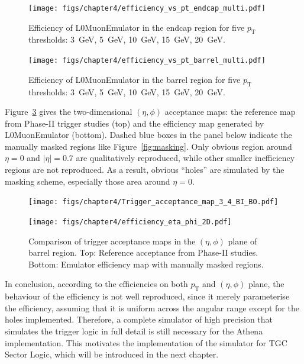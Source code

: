 \begin{figure}[htbp]
  \centering
  \texttt{[image: figs/chapter4/efficiency\_vs\_pt\_endcap\_multi.pdf]}
  \caption{Efficiency of L0MuonEmulator in the endcap region for five $p_\mathrm{T}$ thresholds: 3~GeV, 5~GeV, 10~GeV, 15~GeV, 20~GeV.}
  \label{fig:eff_pt_endcap}
\end{figure}

\begin{figure}[htbp]
  \centering
  \texttt{[image: figs/chapter4/efficiency\_vs\_pt\_barrel\_multi.pdf]}
  \caption{Efficiency of L0MuonEmulator in the barrel region for five $p_\mathrm{T}$ thresholds: 3~GeV, 5~GeV, 10~GeV, 15~GeV, 20~GeV.}
  \label{fig:eff_pt_barrel}
\end{figure}

Figure~\ref{fig:eta_phi_comparison} gives the two-dimensional $(\eta, \phi)$ acceptance maps: the reference map from Phase-II trigger studies (top) and the efficiency map generated by L0MuonEmulator (bottom). Dashed blue boxes in the panel below indicate the manually masked regions like Figure~\ref{fig:masking}. Only obvious region around $\eta = 0$ and $|\eta| = 0.7$ are qualitatively reproduced, while other smaller inefficiency regions are not reproduced. As a result, obvious ``holes'' are simulated by the masking scheme, especially those area around $\eta = 0$.

\begin{figure}[htbp]
  \centering
  \texttt{[image: figs/chapter4/Trigger\_acceptance\_map\_3\_4\_BI\_BO.pdf]}
  \vspace{0.5em}
  
  \texttt{[image: figs/chapter4/efficiency\_eta\_phi\_2D.pdf]}
  
  \caption{Comparison of trigger acceptance maps in the $(\eta, \phi)$ plane of barrel region. Top: Reference acceptance from Phase-II studies. Bottom: Emulator efficiency map with manually masked regions.}
  \label{fig:eta_phi_comparison}
\end{figure}

In conclusion, according to the efficiencies on both $p_\mathrm{T}$ and $(\eta, \phi)$ plane, the behaviour of the efficiency is not well reproduced, since it merely parameterise the efficiency, assuming that it is uniform across the angular range except for the holes implemented. Therefore, a complete simulator of high precision that simulates the trigger logic in full detail is still necessary for the Athena implementation. This motivates the implementation of the simulator for TGC Sector Logic, which will be introduced in the next chapter.
